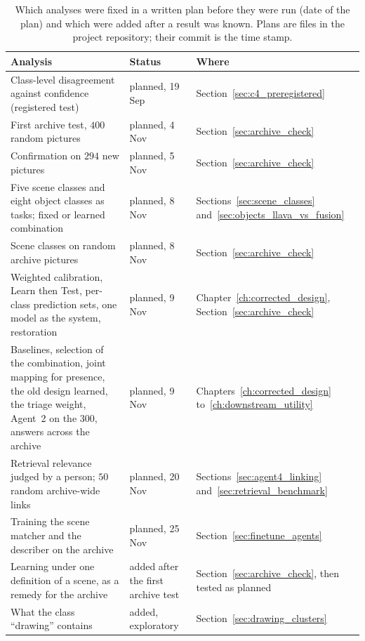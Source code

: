 \begin{table}[!htbp]
\centering
\caption[Planned and added analyses]{Which analyses were fixed in a written plan before they were run (date of the plan) and which were added after a result was known. Plans are files in the project repository; their commit is the time stamp.}
\label{tab:planned_analyses}
\scriptsize
\begin{tabular}{>{\raggedright\arraybackslash}p{5.6cm} >{\raggedright\arraybackslash}p{2.6cm} >{\raggedright\arraybackslash}p{4.8cm}}
\toprule
\textbf{Analysis} & \textbf{Status} & \textbf{Where} \\
\midrule
Class-level disagreement against confidence (registered test) & planned, 19 Sep & Section~\ref{sec:c4_preregistered} \\
First archive test, $400$ random pictures & planned, 4 Nov & Section~\ref{sec:archive_check} \\
Confirmation on $294$ new pictures & planned, 5 Nov & Section~\ref{sec:archive_check} \\
Five scene classes and eight object classes as tasks; fixed or learned combination & planned, 8 Nov & Sections~\ref{sec:scene_classes} and~\ref{sec:objects_llava_vs_fusion} \\
Scene classes on random archive pictures & planned, 8 Nov & Section~\ref{sec:archive_check} \\
Weighted calibration, Learn then Test, per-class prediction sets, one model as the system, restoration & planned, 9 Nov & Chapter~\ref{ch:corrected_design}, Section~\ref{sec:archive_check} \\
Baselines, selection of the combination, joint mapping for presence, the old design learned, the triage weight, Agent~2 on the $300$, answers across the archive & planned, 9 Nov & Chapters~\ref{ch:corrected_design} to~\ref{ch:downstream_utility} \\
Retrieval relevance judged by a person; $50$ random archive-wide links & planned, 20 Nov & Sections~\ref{sec:agent4_linking} and~\ref{sec:retrieval_benchmark} \\
Training the scene matcher and the describer on the archive & planned, 25 Nov & Section~\ref{sec:finetune_agents} \\
\midrule
Learning under one definition of a scene, as a remedy for the archive & added after the first archive test & Section~\ref{sec:archive_check}, then tested as planned \\
What the class ``drawing'' contains & added, exploratory & Section~\ref{sec:drawing_clusters} \\

\end{tabular}
\end{table}
